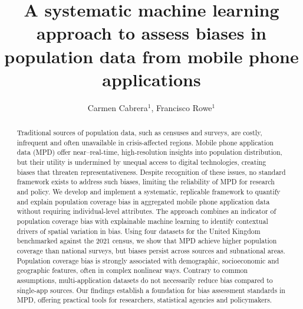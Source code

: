\documentclass[]{rsos}%
\begin{document}
\title{A systematic machine learning approach to assess biases in population data from mobile phone applications}

\author{
Carmen Cabrera$^{1}$,
Francisco Rowe$^{1}$}

\address{
  $^{1}$Geographic Data Science Lab, Department of Geography and Planning, University of Liverpool, Liverpool, United Kingdom.\\
  $^{}$}
\subject{
Mobile phone data,
Human mobility,
Explainable AI,
Spatial analysis}



\begin{abstract}
Traditional sources of population data, such as censuses and surveys, are costly, infrequent and often unavailable in crisis-affected regions. Mobile phone application data (MPD) offer near--real-time, high-resolution insights into population distribution, but their utility is undermined by unequal access to digital technologies, creating biases that threaten representativeness. Despite recognition of these issues, no standard framework exists to address such biases, limiting the reliability of MPD for research and policy. We develop and implement a systematic, replicable framework to quantify and explain population coverage bias in aggregated mobile phone application data without requiring individual-level attributes. The approach combines an indicator of population coverage bias with explainable machine learning to identify contextual drivers of spatial variation in bias. Using four datasets for the United Kingdom benchmarked against the 2021 census, we show that MPD achieve higher population coverage than national surveys, but biases persist across sources and subnational areas. Population coverage bias is strongly associated with demographic, socioeconomic and geographic features, often in complex nonlinear ways. Contrary to common assumptions, multi-application datasets do not necessarily reduce bias compared to single-app sources. Our findings establish a foundation for bias assessment standards in MPD, offering practical tools for researchers, statistical agencies and policymakers.
\end{abstract}
\end{document}
